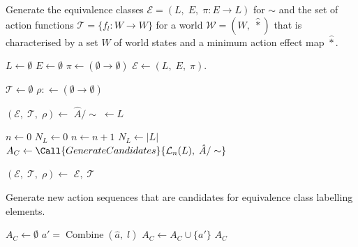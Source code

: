 \begin{algorithm}[H]
\caption{
Generate the equivalence classes $\mathcal{E} = (L, \; E, \; \pi: E \to L)$ for $\sim$ and the set of action functions $\mathcal{T} = \{f_{l}: W \to W\}$ for a world $\mathscr{W} = (W, \; \hat{\ast})$ that is characterised by a set $W$ of world states and a minimum action effect map $\hat{\ast}$.
}
\hrulefill
\begin{algorithmic}[1]
    \Statex {}
    \State $L \gets \emptyset$
    \State $E \gets \emptyset$
    \State $\pi \gets (\emptyset \to \emptyset)$
    \State $\mathcal{E} \gets (L, \; E, \; \pi)$.

    \Statex {}
    \State $\mathcal{T} \gets \emptyset$
    \State $\rho: \gets (\emptyset \to \emptyset)$

    \Statex {}
        \State $(\mathcal{E}, \; \mathcal{T}, \; \rho) \gets$ 
    \EndFor
    \State $\hat{A}/\sim \; \gets L$

    \Statex {}
    \State $n \gets 0$
    \State $N_{L} \gets 0$
    \Statex {}
        \State $n \gets n + 1$
        \State $N_{L} \gets |L|$
        \State $A_{C} \gets \Call{GenerateCandidates}{\mathcal{L}_{n}(L), \;  \hat{A}/\sim}$

            \State $(\mathcal{E}, \; \mathcal{T}, \; \rho) \gets$ 
        \EndFor
    \EndWhile
    \State \Return $\mathcal{E}, \; \mathcal{T}$
\EndProcedure
\end{algorithmic}
\end{algorithm}


\begin{algorithm}[H]
\caption{
Generate new action sequences that are candidates for equivalence class labelling elements.
}
\hrulefill
\begin{algorithmic}[1]
    \State $A_{C} \gets \emptyset$
            \State $a' = \operatorname{Combine}(\hat{a}, \; l)$
            \State $A_{C} \gets A_{C} \cup \{a'\}$
    \EndFor
    \State \Return $A_{C}$
\EndProcedure
\end{algorithmic}
\end{algorithm}


